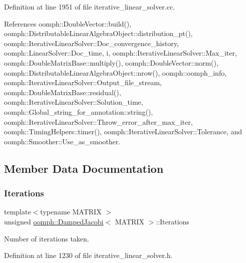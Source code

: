 Definition at line 1951 of file iterative\+\_\+linear\+\_\+solver.\+cc.



References oomph\+::\+Double\+Vector\+::build(), oomph\+::\+Distributable\+Linear\+Algebra\+Object\+::distribution\+\_\+pt(), oomph\+::\+Iterative\+Linear\+Solver\+::\+Doc\+\_\+convergence\+\_\+history, oomph\+::\+Linear\+Solver\+::\+Doc\+\_\+time, i, oomph\+::\+Iterative\+Linear\+Solver\+::\+Max\+\_\+iter, oomph\+::\+Double\+Matrix\+Base\+::multiply(), oomph\+::\+Double\+Vector\+::norm(), oomph\+::\+Distributable\+Linear\+Algebra\+Object\+::nrow(), oomph\+::oomph\+\_\+info, oomph\+::\+Iterative\+Linear\+Solver\+::\+Output\+\_\+file\+\_\+stream, oomph\+::\+Double\+Matrix\+Base\+::residual(), oomph\+::\+Iterative\+Linear\+Solver\+::\+Solution\+\_\+time, oomph\+::\+Global\+\_\+string\+\_\+for\+\_\+annotation\+::string(), oomph\+::\+Iterative\+Linear\+Solver\+::\+Throw\+\_\+error\+\_\+after\+\_\+max\+\_\+iter, oomph\+::\+Timing\+Helpers\+::timer(), oomph\+::\+Iterative\+Linear\+Solver\+::\+Tolerance, and oomph\+::\+Smoother\+::\+Use\+\_\+as\+\_\+smoother.



\subsection{Member Data Documentation}
\mbox{\label{classoomph_1_1DampedJacobi_a432acfaf14b05f8c5b25e62aede36f3c}} 
\subsubsection{\texorpdfstring{Iterations}{Iterations}}
{\footnotesize\ttfamily template$<$typename M\+A\+T\+R\+IX $>$ \\
unsigned \hyperlink{classoomph_1_1DampedJacobi}{oomph\+::\+Damped\+Jacobi}$<$ M\+A\+T\+R\+IX $>$\+::Iterations\hspace{0.3cm}{\ttfamily [private]}}



Number of iterations taken. 



Definition at line 1230 of file iterative\+\_\+linear\+\_\+solver.\+h.

\mbox{\label{classoomph_1_1DampedJacobi_a3f7d560d4c9566fe223de13a777f305d}} 
